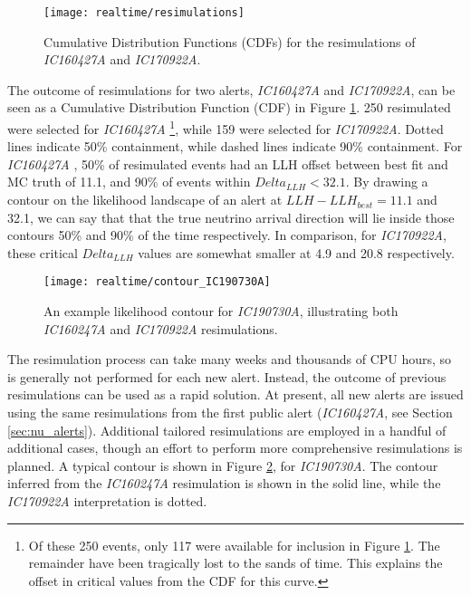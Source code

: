 \begin{figure}
	\centering \texttt{[image: realtime/resimulations]}
	\caption{Cumulative Distribution Functions (CDFs) for the resimulations of \emph{IC160427A} and \emph{IC170922A}.}
	\label{fig:resimulations}
\end{figure}

The outcome of resimulations for two alerts, \emph{IC160427A} and \emph{IC170922A}, can be seen as a Cumulative Distribution Function (CDF) in Figure \ref{fig:resimulations}. 250 resimulated were selected for \emph{IC160427A} \footnote {Of these 250 events, only 117 were available for inclusion in Figure \ref{fig:resimulations}. The remainder have been tragically lost to the sands of time. This explains the offset in critical values from the CDF for this curve.}, while 159 were selected for \emph{IC170922A}. Dotted lines indicate 50\% containment, while dashed lines indicate 90\% containment. For \emph{IC160427A} , 50\% of resimulated events had an LLH offset between best fit and MC truth of 11.1, and 90\% of events within $Delta_{LLH} < 32.1$. By drawing a contour on the likelihood landscape of an alert at $LLH - LLH_{best} = 11.1$ and 32.1, we can say that that the true neutrino arrival direction will lie inside those contours 50\% and 90\% of the time respectively. In comparison, for \emph{IC170922A}, these critical $Delta_{LLH}$ values are somewhat smaller at 4.9 and 20.8 respectively. 

\begin{figure}
	\centering \texttt{[image: realtime/contour\_IC190730A]}
	\caption{An example likelihood contour for \emph{IC190730A}, illustrating both \emph{IC160247A} and \emph{IC170922A} resimulations.}
	\label{fig:ic190730a_contour}
\end{figure}

The resimulation process can take many weeks and thousands of CPU hours, so is generally not performed for each new alert. Instead, the outcome of previous resimulations can be used as a rapid solution. At present, all new alerts are issued using the same resimulations from the first public alert (\emph{IC160427A}, see Section \ref{sec:nu_alerts}). Additional tailored resimulations are employed in a handful of additional cases, though an effort to perform more comprehensive resimulations is planned. A typical contour is shown in Figure \ref{fig:ic190730a_contour}, for \emph{IC190730A}. The contour inferred from the \emph{IC160247A} resimulation is shown in the solid line, while the  \emph{IC170922A} interpretation is dotted. 

